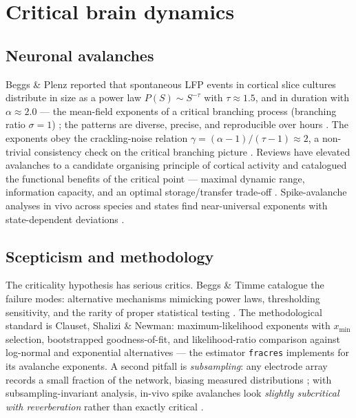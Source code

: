 \documentclass[11pt,a4paper]{article}
\begin{document}
\section{Critical brain dynamics}
\label{sec:criticality}

\subsection{Neuronal avalanches}

Beggs \& Plenz reported that spontaneous LFP events in cortical slice cultures
distribute in size as a power law $P(S) \sim S^{-\tau}$ with
$\tau \approx 1.5$, and in duration with $\alpha \approx 2.0$ --- the
mean-field exponents of a critical branching process (branching ratio
$\sigma = 1$) \cite{beggs2003neuronal}; the patterns are diverse, precise, and
reproducible over hours \cite{beggs2004neuronal}. The exponents obey the
crackling-noise relation $\gamma = (\alpha - 1)/(\tau - 1) \approx 2$, a
non-trivial consistency check on the critical branching picture
\cite{beggs2003neuronal}. Reviews have elevated avalanches to a candidate
organising principle of cortical activity \cite{plenz2007organizing} and
catalogued the functional benefits of the critical point --- maximal dynamic
range, information capacity, and an optimal storage/transfer trade-off
\cite{shew2013functional,chialvo2010emergent}. Spike-avalanche analyses in
vivo across species and states find near-universal exponents with
state-dependent deviations \cite{ribeiro2010spike,dehghani2012avalanche}.

\subsection{Scepticism and methodology}

The criticality hypothesis has serious critics. Beggs \& Timme catalogue the
failure modes: alternative mechanisms mimicking power laws, thresholding
sensitivity, and the rarity of proper statistical testing
\cite{beggs2012being}. The methodological standard is Clauset, Shalizi \&
Newman: maximum-likelihood exponents with $x_{\min}$ selection, bootstrapped
goodness-of-fit, and likelihood-ratio comparison against log-normal and
exponential alternatives \cite{clauset2009power} --- the estimator
\texttt{fracres} implements for its avalanche exponents. A second pitfall is
\emph{subsampling}: any electrode array records a small fraction of the
network, biasing measured distributions \cite{priesemann2009subsampling}; with
subsampling-invariant analysis, in-vivo spike avalanches look
\emph{slightly subcritical with reverberation} rather than exactly critical
\cite{priesemann2014spike}.
\end{document}
